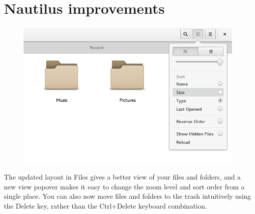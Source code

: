 \documentclass[
letterpaper,
10pt
]{leaflet}
\begin{document}
\section{\textcolor{FedoraBlue}{Nautilus improvements}}
\begin{figure}[h]
  \includegraphics[keepaspectratio,width=\textwidth]{nautilus-f22-cropped.png}
\end{figure}
The updated layout in Files gives a better view of your files and folders, and a new view popover makes it easy to change the zoom level and sort order from a single place. You can also now move files and folders to the trash intuitively using the Delete key, rather than the Ctrl+Delete keyboard combination. 
\end{document}
